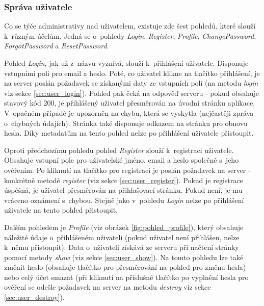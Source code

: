 		\subsubsection{Správa uživatele} %
		Co se týče administrativy nad uživatelem, existuje zde šest pohledů, které slouží k~různým účelům. Jedná se o~pohledy \textit{Login}, \textit{Register}, \textit{Profile}, \textit{ChangePassword}, \textit{ForgotPassword} a \textit{ResetPassword}.
		
		Pohled \textit{Login}, jak už z~názvu vyznívá, slouží k~přihlášení uživatele. Disponuje vstupními poli pro email a heslo. Poté, co uživatel klikne na tlačítko přihlášení, je na server poslán požadavek se získanými daty ze vstupních polí (na metodu \textit{login} viz sekce \ref{sec:user_login}). Pohled pak čeká na odpověď serveru - pokud obsahuje stavový kód 200, je přihlášený uživatel přesměrován na úvodní stránku aplikace. V~opačném případě je upozorněn na chybu, která se vyskytla (nejčastěji zpráva o~chybných údajích). Stránka také disponuje odkazem na stránku pro obnovu hesla. Díky metadatům na tento pohled nelze po přihlášení uživatele přistoupit.
		
		Oproti předchozímu pohledu pohled \textit{Register} slouží k~registraci uživatele. Obsahuje vstupní pole pro uživatelské jméno, email a heslo společně s~jeho ověřením. Po kliknutí na tlačítko pro registraci je poslán požadavek na server - konkrétně metodě \textit{register} (viz sekce \ref{sec:user_register}). Pokud je registrace úspěšná, je uživatel přesměrován na přihlašovací stránku. Pokud není, je mu vráceno oznámení s~chybou. Stejně jako v~pohledu \textit{Login} nelze po přihlášení uživatele na tento pohled přistoupit. 
		
		Dalším pohledem je \textit{Profile} (viz obrázek \ref{fig:pohled_profile}), který obsahuje náležité údaje o~přihlášeném uživateli (pokud uživatel není přihlášen, nelze k~němu přistoupit). Data o~uživateli získává ze serveru při načtení stránky pomocí metody \textit{show} (viz sekce \ref{sec:user_show}). Na tomto pohledu lze také změnit heslo (obsahuje tlačítko pro přesměrování na pohled pro změnu hesla) nebo celý účet smazat (při kliknutí na příslušné tlačítko po vyplnění hesla pro ověření se odešle požadavek na server na metodu \textit{destroy} viz sekce \ref{sec:user_destroy}).
		
